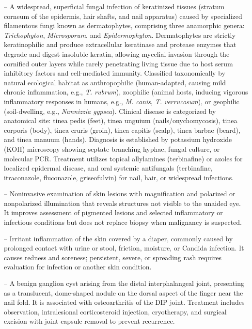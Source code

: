 -- A widespread, superficial fungal infection of keratinized tissues (stratum corneum of the epidermis, hair shafts, and nail apparatus) caused by specialized filamentous fungi known as dermatophytes, comprising three anamorphic genera: \textit{Trichophyton}, \textit{Microsporum}, and \textit{Epidermophyton}. Dermatophytes are strictly keratinophilic and produce extracellular keratinase and protease enzymes that degrade and digest insoluble keratin, allowing mycelial invasion through the cornified outer layers while rarely penetrating living tissue due to host serum inhibitory factors and cell-mediated immunity. Classified taxonomically by natural ecological habitat as anthropophilic (human-adapted, causing mild chronic inflammation, e.g., \textit{T. rubrum}), zoophilic (animal hosts, inducing vigorous inflammatory responses in humans, e.g., \textit{M. canis}, \textit{T. verrucosum}), or geophilic (soil-dwelling, e.g., \textit{Nannizzia gypsea}). Clinical disease is categorized by anatomical site: tinea pedis (feet), tinea unguium (nails/onychomycosis), tinea corporis (body), tinea cruris (groin), tinea capitis (scalp), tinea barbae (beard), and tinea manuum (hands). Diagnosis is established by potassium hydroxide (KOH) microscopy showing septate branching hyphae, fungal culture, or molecular PCR. Treatment utilizes topical allylamines (terbinafine) or azoles for localized epidermal disease, and oral systemic antifungals (terbinafine, itraconazole, fluconazole, griseofulvin) for nail, hair, or widespread infections.

-- Noninvasive examination of skin lesions with magnification and polarized or nonpolarized illumination that reveals structures not visible to the unaided eye. It improves assessment of pigmented lesions and selected inflammatory or infectious conditions but does not replace biopsy when malignancy is suspected.

-- Irritant inflammation of the skin covered by a diaper, commonly caused by prolonged contact with urine or stool, friction, moisture, or Candida infection. It causes redness and soreness; persistent, severe, or spreading rash requires evaluation for infection or another skin condition.

-- A benign ganglion cyst arising from the distal interphalangeal joint, presenting as a translucent, dome-shaped nodule on the dorsal aspect of the finger near the nail fold. It is associated with osteoarthritis of the DIP joint. Treatment includes observation, intralesional corticosteroid injection, cryotherapy, and surgical excision with joint capsule removal to prevent recurrence.

